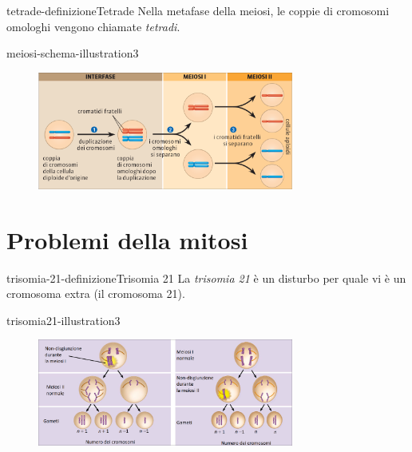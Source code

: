 \documentclass[preview]{standalone}
\begin{document}
\begin{snippetdefinition}{tetrade-definizione}{Tetrade}
    Nella metafase della meiosi, le coppie di cromosomi omologhi vengono chiamate
    \textit{tetradi}.
\end{snippetdefinition}

\begin{snippet}{meiosi-schema-illustration3}
    \begin{center}
    \begin{figure}[ht]
        \centering
        \includegraphics[width=0.75\textwidth]{./resources/meiosi_schema}
    \end{figure}
    \end{center}
\end{snippet}



\section{Problemi della mitosi}

\begin{snippetdefinition}{trisomia-21-definizione}{Trisomia 21}
    La \textit{trisomia 21} è un disturbo per quale vi è un cromosoma extra (il cromosoma 21).
\end{snippetdefinition}

\begin{snippet}{trisomia21-illustration3}
    \begin{center}
    \begin{figure}[ht]
        \centering
        \includegraphics[width=0.75\textwidth]{./resources/trisomia21}
    \end{figure}
    \end{center}
\end{snippet}
\end{document}
